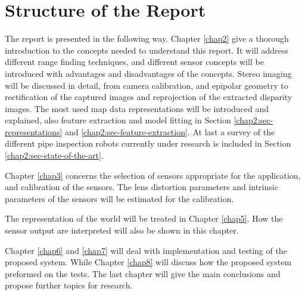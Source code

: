 \section{Structure of the Report}
The report is presented in the following way. Chapter \ref{chap2} give a thorough
introduction to the concepts needed to understand this report. It will address different
range finding techniques, and different sensor concepts will be introduced with advantages
and disadvantages of the concepts. Stereo imaging will be discussed in detail, from camera
calibration, and epipolar geometry to rectification of the captured images and
reprojection of the extracted disparity images. The most used map data representations will be
introduced and explained, also feature extraction and model fitting in Section
\ref{chap2:sec-representations} and \ref{chap2:sec-feature-extraction}. At last a survey
of the different pipe inspection robots currently under research is included in Section
\ref{chap2:sec-state-of-the-art}.

Chapter \ref{chap3} concerns the selection of sensors appropriate for the application, and
calibration of the sensors. The lens distortion parameters and intrinsic parameters of the
sensors will be estimated for the calibration. 

The representation of the world will be treated in Chapter \ref{chap5}. How the sensor
output are interpreted will also be shown in this chapter.

Chapter \ref{chap6} and \ref{chap7} will deal with implementation and testing of the
proposed system. While Chapter \ref{chap8} will discuss how the proposed system preformed
on the tests. The last chapter will give the main conclusions and propose further topics
for research. 

